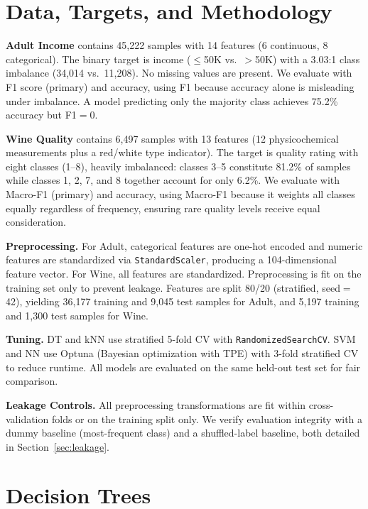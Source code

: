 \documentclass[10pt,twocolumn]{article}
\begin{document}
\section{Data, Targets, and Methodology}

\textbf{Adult Income} contains 45{,}222 samples with 14 features (6 continuous, 8 categorical). The binary target is income ($\leq$50K vs.\ $>$50K) with a 3.03:1 class imbalance (34{,}014 vs.\ 11{,}208). No missing values are present. We evaluate with F1 score (primary) and accuracy, using F1 because accuracy alone is misleading under imbalance. A model predicting only the majority class achieves 75.2\% accuracy but F1$=$0.

\textbf{Wine Quality} contains 6{,}497 samples with 13 features (12 physicochemical measurements plus a red/white type indicator). The target is quality rating with eight classes (1--8), heavily imbalanced: classes 3--5 constitute 81.2\% of samples while classes 1, 2, 7, and 8 together account for only 6.2\%. We evaluate with Macro-F1 (primary) and accuracy, using Macro-F1 because it weights all classes equally regardless of frequency, ensuring rare quality levels receive equal consideration.

\textbf{Preprocessing.} For Adult, categorical features are one-hot encoded and numeric features are standardized via \texttt{StandardScaler}, producing a 104-dimensional feature vector. For Wine, all features are standardized. Preprocessing is fit on the training set only to prevent leakage. Features are split 80/20 (stratified, seed$=$42), yielding 36{,}177 training and 9{,}045 test samples for Adult, and 5{,}197 training and 1{,}300 test samples for Wine.

\textbf{Tuning.} DT and kNN use stratified 5-fold CV with \texttt{RandomizedSearchCV}. SVM and NN use Optuna (Bayesian optimization with TPE) with 3-fold stratified CV to reduce runtime. All models are evaluated on the same held-out test set for fair comparison.

\textbf{Leakage Controls.} All preprocessing transformations are fit within cross-validation folds or on the training split only. We verify evaluation integrity with a dummy baseline (most-frequent class) and a shuffled-label baseline, both detailed in Section~\ref{sec:leakage}.

\section{Decision Trees}
\end{document}
